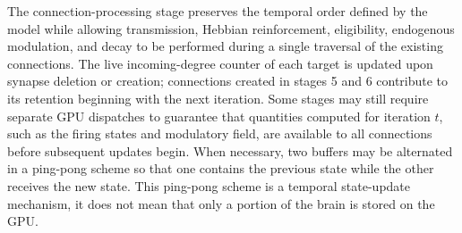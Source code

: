 \documentclass[12pt,a4paper]{article}
\begin{document}
	The connection-processing stage preserves the temporal order defined by the model while allowing transmission, Hebbian reinforcement, eligibility, endogenous modulation, and decay to be performed during a single traversal of the existing connections. The live incoming-degree counter of each target is updated upon synapse deletion or creation; connections created in stages 5 and 6 contribute to its retention beginning with the next iteration. Some stages may still require separate GPU dispatches to guarantee that quantities computed for iteration $t$, such as the firing states and modulatory field, are available to all connections before subsequent updates begin. When necessary, two buffers may be alternated in a ping-pong scheme so that one contains the previous state while the other receives the new state. This ping-pong scheme is a temporal state-update mechanism, it does not mean that only a portion of the brain is stored on the GPU.					
				
\end{document}
